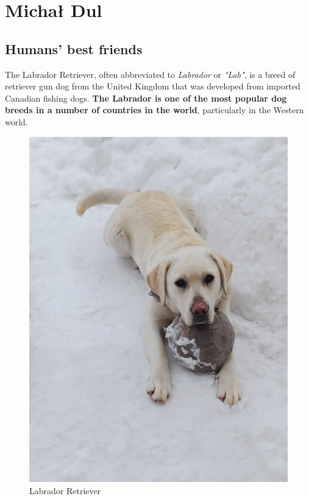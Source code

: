 \newpage
\section{Michał Dul}
\label{sec:dulmicha}

\subsection{Humans' best friends}
The Labrador Retriever, often abbreviated to \emph{Labrador} or \emph{"Lab"}, is a breed of retriever gun dog from the United Kingdom that was developed from imported Canadian fishing dogs. \textbf{The Labrador is one of the most popular dog breeds in a number of countries in the world}, particularly in the Western world.

\begin{figure}[H]
\includegraphics[scale=0.1]{pictures/dulmicha/tobi.jpg}
\centering
\caption{Labrador Retriever}
\label{fig:tobi}
\end{figure}

